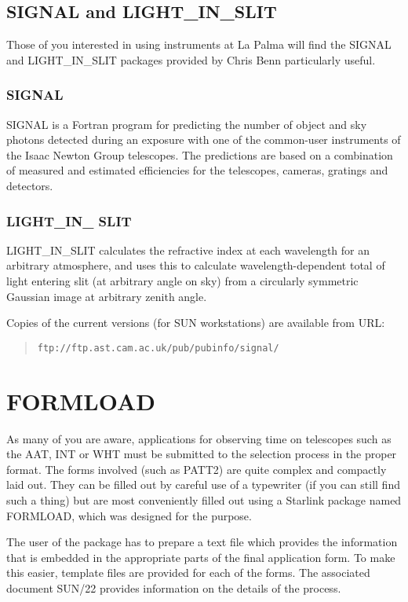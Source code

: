 \documentclass[twoside,11pt]{article}
\newcommand{\xref}[3]{#1}
\newcommand{\xlabel}[1]{}
\newcommand{\SUNFORMref}{\xref{SUN/22}{sun22}{}}
\begin{document}
\subsection{SIGNAL and LIGHT\_IN\_SLIT} \xlabel{SIGNAL}
\label{sec:signal}
Those of you interested in using instruments at La Palma will find the SIGNAL and
LIGHT\_IN\_SLIT packages provided by Chris Benn particularly useful. 

\subsubsection{SIGNAL}

SIGNAL is a Fortran program for predicting the number of object and sky
photons detected during an exposure with one of the common-user instruments
of the Isaac Newton Group telescopes. The predictions are based on a
combination of measured and estimated efficiencies for the telescopes,
cameras, gratings and detectors. 

\subsubsection{LIGHT\_IN\_ SLIT}

LIGHT\_IN\_SLIT calculates the refractive index at each wavelength for an
arbitrary atmosphere, and uses this to calculate wavelength-dependent total of
light entering slit (at arbitrary angle on sky) from a circularly symmetric
Gaussian image at arbitrary zenith angle. 

Copies of the current versions (for SUN workstations) are available
from URL:
\begin{quote}
{\tt ftp://ftp.ast.cam.ac.uk/pub/pubinfo/signal/}
\end{quote}

\section{FORMLOAD} \xlabel{FORMLOAD}
\label{sec:formload}

As many of you are aware, applications for observing time on
telescopes such as the AAT, INT or WHT must be submitted to the
selection process in the proper format. The forms involved (such as PATT2)
are quite complex and compactly laid out. They can be filled out by careful
use of a typewriter (if you can still find such a thing) but are most
conveniently filled out using a Starlink package named FORMLOAD, which was 
designed for the purpose. 

The user of the package has to prepare a text file which provides the
information that is embedded in the appropriate parts of the final 
application form. To make this easier, template files are provided for each 
of the forms. The associated document {\SUNFORMref} provides information
on the details of the process. 
\end{document}
